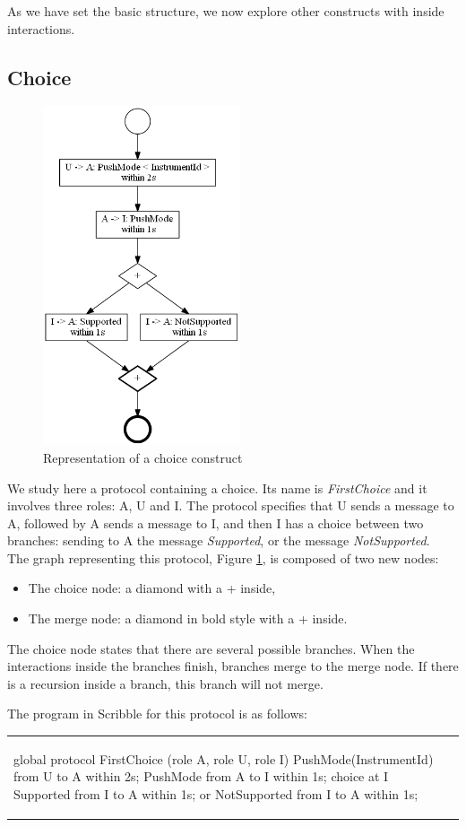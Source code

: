 \documentclass[a4paper,11pt,twoside]{report}
\begin{document}
As we have set the basic structure, we now explore other constructs with inside interactions.


\subsection{Choice}
\begin{figure}[h]
\begin{center}
\includegraphics[height=10cm]{Choice}\caption{Representation of a choice construct}
\label{fig:Choice}
\end{center}
\end{figure}
We study here a protocol containing a choice. Its name is \emph{FirstChoice} and it involves three roles: A, U and I. The protocol specifies that U sends a message to A, followed by A sends a message to I, and then I has a choice between two branches:  sending to A the message \emph{Supported}, or the message \emph{NotSupported}.\\
The graph representing this protocol, Figure \ref{fig:Choice}, is composed of two new nodes:
\begin{itemize}
\item The choice node: a diamond with a + inside,
\item The merge node: a diamond in bold style with a + inside.
\end{itemize}
The choice node states that there are several possible branches. When the interactions inside the branches finish, branches merge to the merge node. If there is a recursion inside a branch, this branch will not merge.

The program in Scribble for this protocol is as follows:
\begin{center}
\begin{tabular}{ll}
\begin{SJLISTING}
global protocol FirstChoice (role A, role U, role I) {
	PushMode(InstrumentId) from U to A within 2s;
	PushMode from A to I within 1s;
	choice at I {
		Supported from I to A within 1s;
		} or {
		NotSupported from I to A within 1s;
		}
}
\end{SJLISTING}
& \\
\end{tabular}
\end{center}
\end{document}
